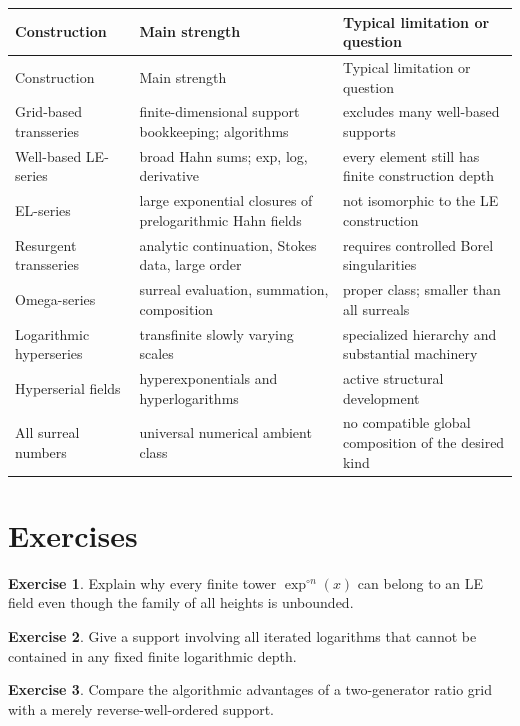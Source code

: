\documentclass[11pt,openany]{book}
\theoremstyle{definition}
\newtheorem{exercise}{Exercise}[chapter]
\theoremstyle{plain}
\theoremstyle{remark}
\begin{document}
\begin{longtable}{>{\raggedright\arraybackslash}p{}
                  >{\raggedright\arraybackslash}p{}
                  >{\raggedright\arraybackslash}p{}}
\toprule
Construction & Main strength & Typical limitation or question\\
\midrule
\endfirsthead
\toprule
Construction & Main strength & Typical limitation or question\\
\midrule
\endhead
Grid-based transseries & finite-dimensional support bookkeeping; algorithms & excludes many well-based supports\\
Well-based LE-series & broad Hahn sums; exp, log, derivative & every element still has finite construction depth\\
EL-series & large exponential closures of prelogarithmic Hahn fields & not isomorphic to the LE construction\\
Resurgent transseries & analytic continuation, Stokes data, large order & requires controlled Borel singularities\\
Omega-series & surreal evaluation, summation, composition & proper class; smaller than all surreals\\
Logarithmic hyperseries & transfinite slowly varying scales & specialized hierarchy and substantial machinery\\
Hyperserial fields & hyperexponentials and hyperlogarithms & active structural development\\
All surreal numbers & universal numerical ambient class & no compatible global composition of the desired kind\\
\bottomrule
\end{longtable}

\section{Exercises}

\begin{exercise}
Explain why every finite tower $\exp^{\circ n}(x)$ can belong to an LE field even though the family of all heights is unbounded.
\end{exercise}

\begin{exercise}
Give a support involving all iterated logarithms that cannot be contained in any fixed finite logarithmic depth.
\end{exercise}

\begin{exercise}
Compare the algorithmic advantages of a two-generator ratio grid with a merely reverse-well-ordered support.
\end{exercise}
\end{document}
